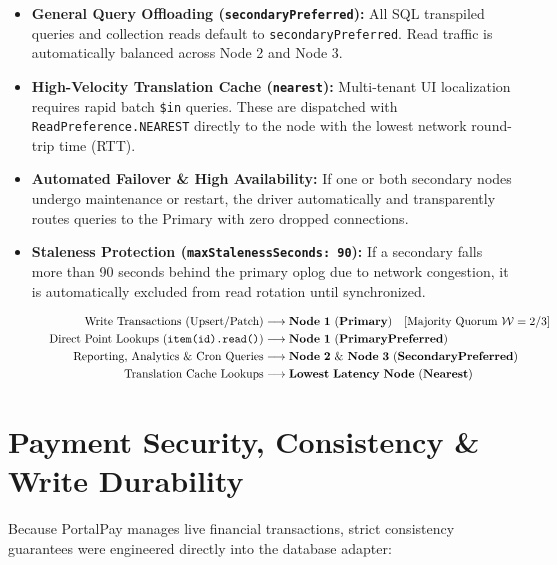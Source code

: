 \documentclass[11pt,a4paper]{article}
\begin{document}
\begin{itemize}
    \item \textbf{General Query Offloading (\texttt{secondaryPreferred}):} All SQL transpiled queries and collection reads default to \texttt{secondaryPreferred}. Read traffic is automatically balanced across Node 2 and Node 3.
    \item \textbf{High-Velocity Translation Cache (\texttt{nearest}):} Multi-tenant UI localization requires rapid batch \texttt{\$in} queries. These are dispatched with \texttt{ReadPreference.NEAREST} directly to the node with the lowest network round-trip time (RTT).
    \item \textbf{Automated Failover \& High Availability:} If one or both secondary nodes undergo maintenance or restart, the driver automatically and transparently routes queries to the Primary with zero dropped connections.
    \item \textbf{Staleness Protection (\texttt{maxStalenessSeconds: 90}):} If a secondary falls more than 90 seconds behind the primary oplog due to network congestion, it is automatically excluded from read rotation until synchronized.
\end{itemize}

\begin{figure}[h!]
\centering
\begin{tcolorbox}[colback=white,colframe=primary,arc=2pt,title=\textbf{Traffic Distribution Model}]
\small
\begin{align*}
\text{Write Transactions (Upsert/Patch)} &\longrightarrow \mathbf{Node\ 1\ (Primary)} \quad [\text{Majority Quorum}\ \mathcal{W}=2/3] \\
\text{Direct Point Lookups (\texttt{item(id).read()})} &\longrightarrow \mathbf{Node\ 1\ (PrimaryPreferred)} \\
\text{Reporting, Analytics \& Cron Queries} &\longrightarrow \mathbf{Node\ 2\ \&\ Node\ 3\ (SecondaryPreferred)} \\
\text{Translation Cache Lookups} &\longrightarrow \mathbf{Lowest\ Latency\ Node\ (Nearest)}
\end{align*}
\end{tcolorbox}
\end{figure}

\section{Payment Security, Consistency \& Write Durability}

Because PortalPay manages live financial transactions, strict consistency guarantees were engineered directly into the database adapter:
\end{document}
